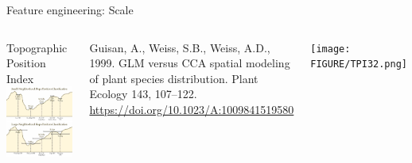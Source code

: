 \begin{frame}{Feature engineering: \alert{Scale}}
\begin{columns}
 \column{5cm}
 \begin{block}{Topographic Position Index}
\centering\includegraphics[width=1\textwidth]{FIGURE/TPI.png}
\end{block}

\raggedright\tiny Guisan, A., Weiss, S.B., Weiss, A.D., 1999. GLM versus CCA spatial modeling of plant species distribution. Plant Ecology 143, 107–122. \url{https://doi.org/10.1023/A:1009841519580    }

\column{5cm}
\centering\texttt{[image: FIGURE/TPI32.png]}

\end{columns}
\end{frame}

